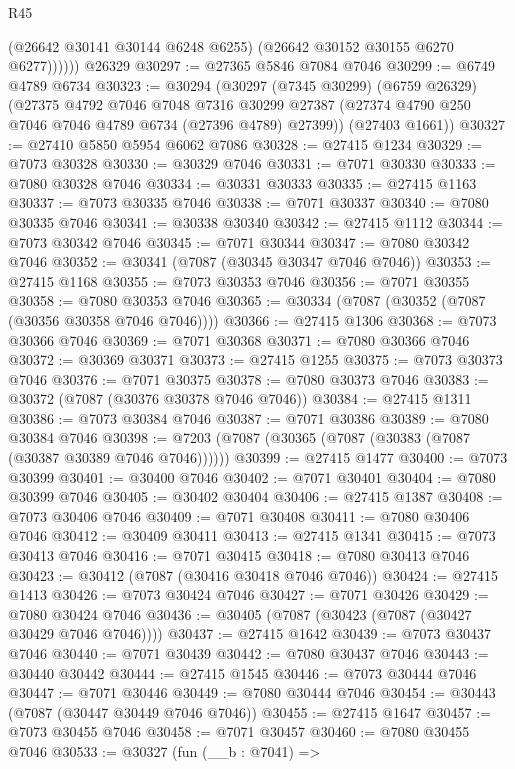 \begin{lexlean}{R45}
\begin{coremodule}
{              (@26642 @30141 @30144 @6248 @6255)
              (@26642 @30152 @30155 @6270 @6277))))))
    @26329
@30297 := @27365 @5846 @7084 @7046
@30299 := @6749 @4789 @6734
@30323 := @30294
    (@30297
      (@7345 @30299)
      (@6759 @26329)
      (@27375
        @4792
        @7046
        @7048
        @7316
        @30299
        @27387
        (@27374 @4790 @250 @7046 @7046 @4789 @6734 (@27396 @4789) @27399))
      (@27403 @1661))
@30327 := @27410 @5850 @5954 @6062 @7086
@30328 := @27415 @1234
@30329 := @7073 @30328
@30330 := @30329 @7046
@30331 := @7071 @30330
@30333 := @7080 @30328 @7046
@30334 := @30331 @30333
@30335 := @27415 @1163
@30337 := @7073 @30335 @7046
@30338 := @7071 @30337
@30340 := @7080 @30335 @7046
@30341 := @30338 @30340
@30342 := @27415 @1112
@30344 := @7073 @30342 @7046
@30345 := @7071 @30344
@30347 := @7080 @30342 @7046
@30352 := @30341 (@7087 (@30345 @30347 @7046 @7046))
@30353 := @27415 @1168
@30355 := @7073 @30353 @7046
@30356 := @7071 @30355
@30358 := @7080 @30353 @7046
@30365 := @30334 (@7087 (@30352 (@7087 (@30356 @30358 @7046 @7046))))
@30366 := @27415 @1306
@30368 := @7073 @30366 @7046
@30369 := @7071 @30368
@30371 := @7080 @30366 @7046
@30372 := @30369 @30371
@30373 := @27415 @1255
@30375 := @7073 @30373 @7046
@30376 := @7071 @30375
@30378 := @7080 @30373 @7046
@30383 := @30372 (@7087 (@30376 @30378 @7046 @7046))
@30384 := @27415 @1311
@30386 := @7073 @30384 @7046
@30387 := @7071 @30386
@30389 := @7080 @30384 @7046
@30398 := @7203 (@7087 (@30365 (@7087 (@30383 (@7087 (@30387 @30389 @7046 @7046))))))
@30399 := @27415 @1477
@30400 := @7073 @30399
@30401 := @30400 @7046
@30402 := @7071 @30401
@30404 := @7080 @30399 @7046
@30405 := @30402 @30404
@30406 := @27415 @1387
@30408 := @7073 @30406 @7046
@30409 := @7071 @30408
@30411 := @7080 @30406 @7046
@30412 := @30409 @30411
@30413 := @27415 @1341
@30415 := @7073 @30413 @7046
@30416 := @7071 @30415
@30418 := @7080 @30413 @7046
@30423 := @30412 (@7087 (@30416 @30418 @7046 @7046))
@30424 := @27415 @1413
@30426 := @7073 @30424 @7046
@30427 := @7071 @30426
@30429 := @7080 @30424 @7046
@30436 := @30405 (@7087 (@30423 (@7087 (@30427 @30429 @7046 @7046))))
@30437 := @27415 @1642
@30439 := @7073 @30437 @7046
@30440 := @7071 @30439
@30442 := @7080 @30437 @7046
@30443 := @30440 @30442
@30444 := @27415 @1545
@30446 := @7073 @30444 @7046
@30447 := @7071 @30446
@30449 := @7080 @30444 @7046
@30454 := @30443 (@7087 (@30447 @30449 @7046 @7046))
@30455 := @27415 @1647
@30457 := @7073 @30455 @7046
@30458 := @7071 @30457
@30460 := @7080 @30455 @7046
@30533 := @30327
    (fun (__b : @7041) =>
}
\end{coremodule}
\end{lexlean}

